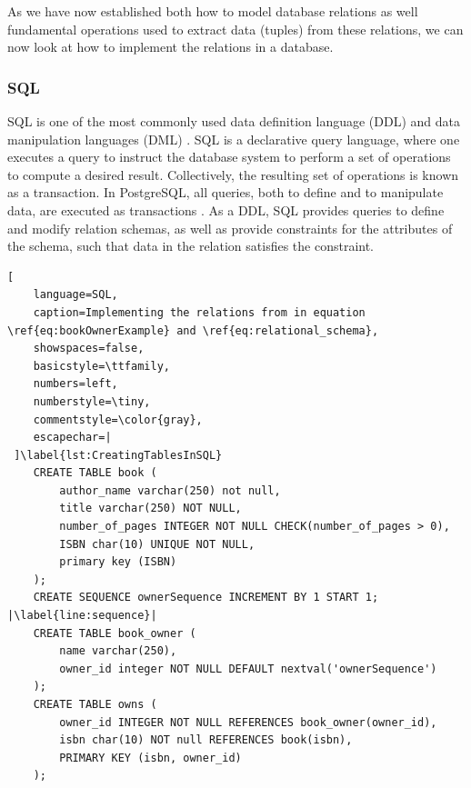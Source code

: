As we have now established both how to model database relations as well fundamental operations used to extract data (tuples) from these relations, we can now look at how to implement the relations in a database.

\subsubsection{SQL}\label{sec:SQL}
SQL is one of the most commonly used data definition language (DDL) and data manipulation languages (DML) \cite[Chapter 3.1]{DBSBook}.
SQL is a declarative query language, where one executes a query to instruct the database system to perform a set of operations to compute a desired result. 
Collectively, the resulting set of operations is known as a transaction.
In PostgreSQL, all queries, both to define and to manipulate data, are executed as transactions \cite{postgres_transactions}.
As a DDL, SQL provides queries to define and modify relation schemas, as well as provide constraints for the attributes of the schema, such that data in the relation satisfies the constraint.  


\begin{lstlisting}[
    language=SQL,
    caption=Implementing the relations from in equation \ref{eq:bookOwnerExample} and \ref{eq:relational_schema},
    showspaces=false,
    basicstyle=\ttfamily,
    numbers=left,
    numberstyle=\tiny,
    commentstyle=\color{gray},
    escapechar=|
 ]\label{lst:CreatingTablesInSQL}
    CREATE TABLE book (
        author_name varchar(250) not null,
        title varchar(250) NOT NULL,
        number_of_pages INTEGER NOT NULL CHECK(number_of_pages > 0),
        ISBN char(10) UNIQUE NOT NULL,
        primary key (ISBN)
    );
    CREATE SEQUENCE ownerSequence INCREMENT BY 1 START 1; |\label{line:sequence}|
    CREATE TABLE book_owner (
        name varchar(250),
        owner_id integer NOT NULL DEFAULT nextval('ownerSequence')
    );
    CREATE TABLE owns (
        owner_id INTEGER NOT NULL REFERENCES book_owner(owner_id),
        isbn char(10) NOT null REFERENCES book(isbn),
        PRIMARY KEY (isbn, owner_id)
    );
\end{lstlisting}

